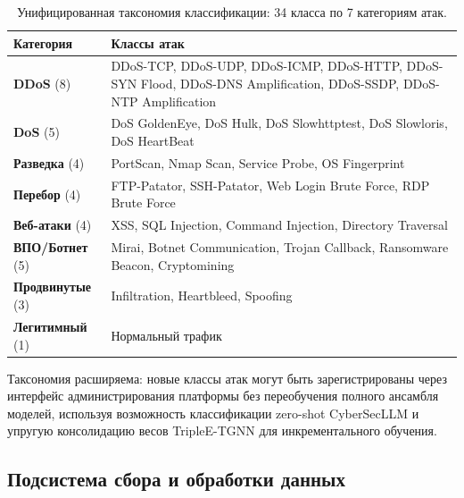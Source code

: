 \begin{table}[htbp]\centering\small
\caption{Унифицированная таксономия классификации: 34 класса по 7 категориям атак.}
\label{tab:taxonomy}
\small
\renewcommand{\arraystretch}{0.92}\begin{tabular}{p{2.5cm} p{10.5cm}}
\toprule
\textbf{Категория} & \textbf{Классы атак} \\
\midrule
\textbf{DDoS} (8) & DDoS-TCP, DDoS-UDP, DDoS-ICMP, DDoS-HTTP, DDoS-SYN Flood, DDoS-DNS Amplification, DDoS-SSDP, DDoS-NTP Amplification \\
\addlinespace
\textbf{DoS} (5) & DoS GoldenEye, DoS Hulk, DoS Slowhttptest, DoS Slowloris, DoS HeartBeat \\
\addlinespace
\textbf{Разведка} (4) & PortScan, Nmap Scan, Service Probe, OS Fingerprint \\
\addlinespace
\textbf{Перебор} (4) & FTP-Patator, SSH-Patator, Web Login Brute Force, RDP Brute Force \\
\addlinespace
\textbf{Веб-атаки} (4) & XSS, SQL Injection, Command Injection, Directory Traversal \\
\addlinespace
\textbf{ВПО/Ботнет} (5) & Mirai, Botnet Communication, Trojan Callback, Ransomware Beacon, Cryptomining \\
\addlinespace
\textbf{Продвинутые} (3) & Infiltration, Heartbleed, Spoofing \\
\addlinespace
\textbf{Легитимный} (1) & Нормальный трафик \\
\bottomrule
\end{tabular}
\end{table}

Таксономия расширяема: новые классы атак могут быть зарегистрированы через интерфейс администрирования платформы без переобучения полного ансамбля моделей, используя возможность классификации zero-shot CyberSecLLM и упругую консолидацию весов TripleE-TGNN для инкрементального обучения.

\subsection{Подсистема сбора и обработки данных}
\label{subsec:func_ingestion}

